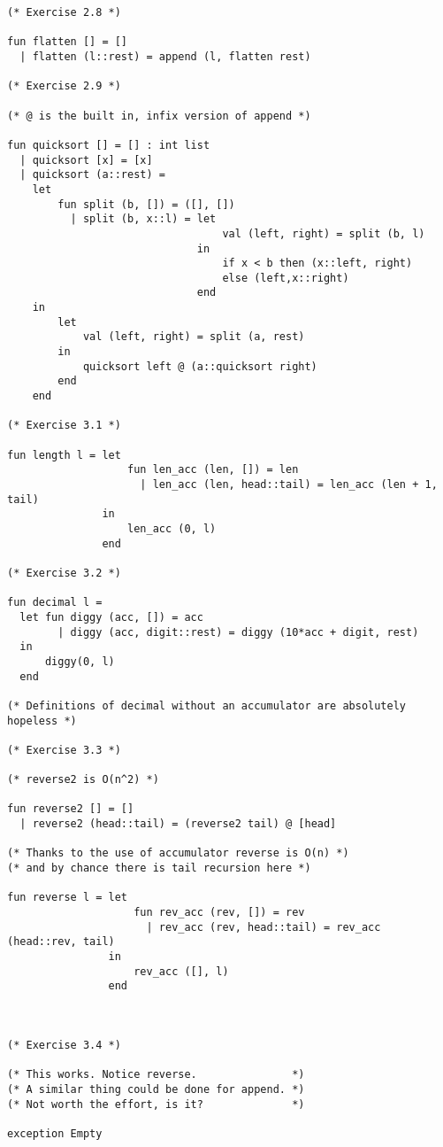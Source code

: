 \begin{verbatim}
(* Exercise 2.8 *)

fun flatten [] = []
  | flatten (l::rest) = append (l, flatten rest)

(* Exercise 2.9 *)

(* @ is the built in, infix version of append *)     

fun quicksort [] = [] : int list
  | quicksort [x] = [x]
  | quicksort (a::rest) = 
    let 
        fun split (b, []) = ([], [])
          | split (b, x::l) = let 
                                  val (left, right) = split (b, l)
                              in
                                  if x < b then (x::left, right)
                                  else (left,x::right)
                              end
    in 
        let
            val (left, right) = split (a, rest)
        in
            quicksort left @ (a::quicksort right)
        end
    end

(* Exercise 3.1 *) 

fun length l = let
                   fun len_acc (len, []) = len
                     | len_acc (len, head::tail) = len_acc (len + 1, tail)
               in
                   len_acc (0, l)
               end

(* Exercise 3.2 *)

fun decimal l = 
  let fun diggy (acc, []) = acc
        | diggy (acc, digit::rest) = diggy (10*acc + digit, rest)
  in
      diggy(0, l)
  end

(* Definitions of decimal without an accumulator are absolutely hopeless *)

(* Exercise 3.3 *)

(* reverse2 is O(n^2) *)

fun reverse2 [] = []
  | reverse2 (head::tail) = (reverse2 tail) @ [head] 

(* Thanks to the use of accumulator reverse is O(n) *)
(* and by chance there is tail recursion here *)

fun reverse l = let
                    fun rev_acc (rev, []) = rev
                      | rev_acc (rev, head::tail) = rev_acc (head::rev, tail) 
                in
                    rev_acc ([], l)
                end



(* Exercise 3.4 *)

(* This works. Notice reverse.               *)
(* A similar thing could be done for append. *)
(* Not worth the effort, is it?              *)

exception Empty


\end{verbatim}
